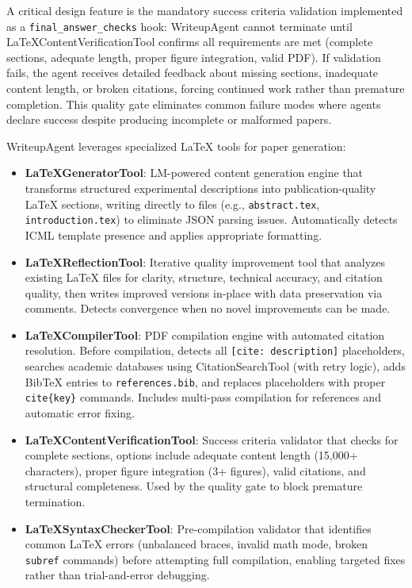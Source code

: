 \documentclass{article}
\begin{document}
A critical design feature is the mandatory success criteria validation implemented as a \texttt{final\_answer\_checks} hook: WriteupAgent cannot terminate until LaTeXContentVerificationTool confirms all requirements are met (complete sections, adequate length, proper figure integration, valid PDF). If validation fails, the agent receives detailed feedback about missing sections, inadequate content length, or broken citations, forcing continued work rather than premature completion. This quality gate eliminates common failure modes where agents declare success despite producing incomplete or malformed papers.

WriteupAgent leverages specialized LaTeX tools for paper generation:
\begin{itemize}
\item \textbf{LaTeXGeneratorTool}: LM-powered content generation engine that transforms structured experimental descriptions into publication-quality LaTeX sections, writing directly to files (e.g., \texttt{abstract.tex}, \texttt{introduction.tex}) to eliminate JSON parsing issues. Automatically detects ICML template presence and applies appropriate formatting.
\item \textbf{LaTeXReflectionTool}: Iterative quality improvement tool that analyzes existing LaTeX files for clarity, structure, technical accuracy, and citation quality, then writes improved versions in-place with data preservation via comments. Detects convergence when no novel improvements can be made.
\item \textbf{LaTeXCompilerTool}: PDF compilation engine with automated citation resolution. Before compilation, detects all \texttt{[cite: description]} placeholders, searches academic databases using CitationSearchTool (with retry logic), adds BibTeX entries to \texttt{references.bib}, and replaces placeholders with proper \texttt{\\cite\{key\}} commands. Includes multi-pass compilation for references and automatic error fixing.
\item \textbf{LaTeXContentVerificationTool}: Success criteria validator that checks for complete sections, options include adequate content length (15,000+ characters), proper figure integration (3+ figures), valid citations, and structural completeness. Used by the quality gate to block premature termination.
\item \textbf{LaTeXSyntaxCheckerTool}: Pre-compilation validator that identifies common LaTeX errors (unbalanced braces, invalid math mode, broken \texttt{\\subref} commands) before attempting full compilation, enabling targeted fixes rather than trial-and-error debugging.
\end{itemize}
\end{document}
